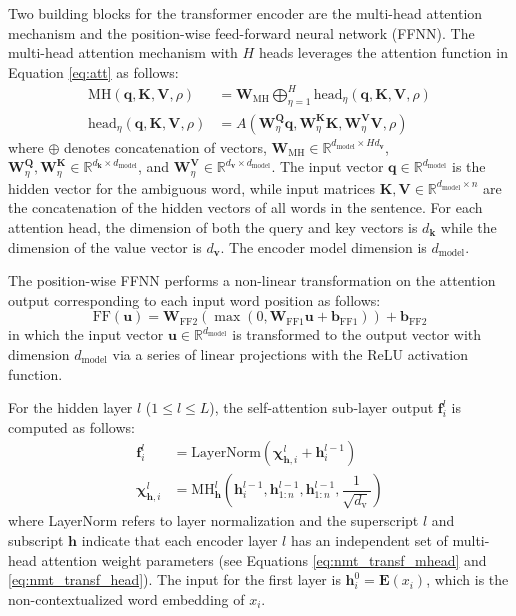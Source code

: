 \documentclass[11pt,a4paper]{article}
\begin{document}
Two building blocks for the transformer encoder are the multi-head attention mechanism and the position-wise feed-forward neural network (FFNN). The multi-head attention mechanism with $H$ heads leverages the attention function in Equation \ref{eq:att} as follows:
\begin{align}
\label{eq:nmt_transf_mhead}
\text{MH}(\mathbf{q}, \mathbf{K}, \mathbf{V}, \rho) &= \mathbf{W}_{\text{MH}} \bigoplus_{\eta=1}^{H} \text{head}_\eta(\mathbf{q}, \mathbf{K}, \mathbf{V}, \rho) \\
\label{eq:nmt_transf_head}
\text{head}_\eta(\mathbf{q}, \mathbf{K}, \mathbf{V}, \rho) &= A(\mathbf{W}^\mathbf{Q}_\eta \mathbf{q}, \mathbf{W}^\mathbf{K}_\eta \mathbf{K}, \mathbf{W}^\mathbf{V}_\eta \mathbf{V}, \rho)
\end{align}
where $\oplus$ denotes concatenation of vectors, $\mathbf{W}_\text{MH} \in \mathbb{R}^{d_\text{model} \times Hd_\mathbf{v}}$, $\mathbf{W}^\mathbf{Q}_\eta, \mathbf{W}^\mathbf{K}_\eta \in \mathbb{R}^{d_\mathbf{k} \times d_\text{model}}$, and $ \mathbf{W}^\mathbf{V}_\eta \in \mathbb{R}^{d_\mathbf{v} \times d_\text{model}}$. The input vector $\mathbf{q} \in \mathbb{R}^{d_\text{model}}$ is the hidden vector for the ambiguous word, while input matrices $\mathbf{K}, \mathbf{V} \in \mathbb{R}^{d_\text{model} \times n}$ are the concatenation of the hidden vectors of all words in the sentence. For each attention head, the dimension of both the query and key vectors is $d_\mathbf{k}$ while the dimension of the value vector is $d_\mathbf{v}$. The encoder model dimension is $d_\text{model}$.

The position-wise FFNN performs a non-linear transformation on the attention output corresponding to each input word position as follows:
\begin{equation}
\label{eq:nmt_transf_ffnn}
\text{FF}(\mathbf{u}) = \mathbf{W}_\text{FF2} (\max(0, \mathbf{W}_\text{FF1} \mathbf{u} + \mathbf{b}_\text{FF1})) + \mathbf{b}_\text{FF2}
\end{equation}
in which the input vector $\mathbf{u} \in \mathbb{R}^{d_\text{model}}$ is transformed to the output vector with dimension $d_\text{model}$ via a series of linear projections with the ReLU activation function.

For the hidden layer $l$ ($1 \le l \le L$), the self-attention sub-layer output $\mathbf{f}^l_i$ is computed as follows:
\begin{align*}
\mathbf{f}^l_i &= \text{LayerNorm}(\mathbf{\chi}^l_{\mathbf{h},i} + \mathbf{h}^{l-1}_i) \\
\mathbf{\chi}^l_{\mathbf{h},i} &= \text{MH}^l_\mathbf{h}(\mathbf{h}^{l-1}_{i}, \mathbf{h}^{l-1}_{1:n}, \mathbf{h}^{l-1}_{1:n}, \dfrac{1}{\sqrt{d_\text{v}}})
\end{align*}
where LayerNorm refers to layer normalization \cite{DBLP:journals/corr/BaKH16} and the superscript $l$ and subscript $\mathbf{h}$ indicate that each encoder layer $l$ has an independent set of multi-head attention weight parameters (see Equations \ref{eq:nmt_transf_mhead} and \ref{eq:nmt_transf_head}). The input for the first layer is $\mathbf{h}^0_i = \mathbf{E}(x_i)$, which is the non-contextualized word embedding of $x_i$.
\end{document}
